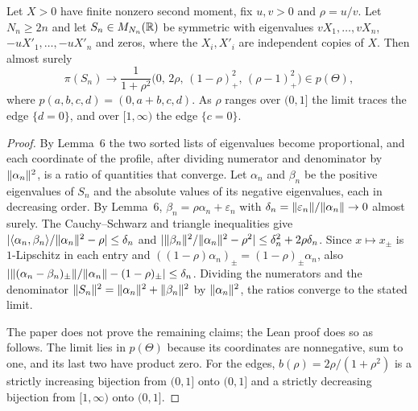 \setcounter{theorem}{4}
\begin{theorem}[Accumulation]
\label{thm:accumulation}
\leanok
{}
Let $X>0$ have finite nonzero second moment, fix $u,v>0$ and $\rho=u/v$. Let
$N_n\ge2n$ and let $S_n\in M_{N_n}(\mathbb{R})$ be symmetric with eigenvalues
$vX_1,\ldots,vX_n$, $-uX'_1,\ldots,-uX'_n$ and zeros, where the $X_i,X'_i$
are independent copies of $X$. Then almost surely
\[
 \pi(S_n)\longrightarrow\frac1{1+\rho^2}\bigl(0,\,2\rho,\,(1-\rho)_+^2,\,(\rho-1)_+^2\bigr)\in p(\Theta),
\]
where $p(a,b,c,d)=(0,a+b,c,d)$. As $\rho$ ranges over $(0,1]$ the limit
traces the edge $\{d=0\}$, and over $[1,\infty)$ the edge $\{c=0\}$.
\end{theorem}
\begin{proof}
\leanok
{}
By Lemma~6 the two sorted lists of eigenvalues become proportional, and
each coordinate of the profile, after dividing numerator and denominator
by $\lVert \alpha_n\rVert^2$, is a ratio of quantities that converge. Let
$\alpha_n$ and $\beta_n$ be the positive eigenvalues of $S_n$ and the
absolute values of its negative eigenvalues, each in decreasing order. By
Lemma~6, $\beta_n=\rho\alpha_n+\varepsilon_n$ with
$\delta_n=\lVert \varepsilon_n\rVert/\lVert \alpha_n\rVert\to0$ almost surely. The
Cauchy--Schwarz and triangle inequalities give
$|\langle\alpha_n,\beta_n\rangle/\lVert \alpha_n\rVert^2-\rho|\le\delta_n$ and
$|\lVert \beta_n\rVert^2/\lVert \alpha_n\rVert^2-\rho^2|\le\delta_n^2+2\rho\delta_n$.
Since $x\mapsto x_\pm$ is $1$-Lipschitz in each entry and
$((1-\rho)\alpha_n)_\pm=(1-\rho)_\pm\alpha_n$, also
$|\lVert (\alpha_n-\beta_n)_\pm\rVert/\lVert \alpha_n\rVert-(1-\rho)_\pm|\le\delta_n$.
Dividing the numerators and the denominator
$\lVert S_n\rVert^2=\lVert \alpha_n\rVert^2+\lVert \beta_n\rVert^2$ by $\lVert \alpha_n\rVert^2$,
the ratios converge to the stated limit.

The paper does not prove the remaining claims; the Lean proof does so as
follows. The limit lies in $p(\Theta)$ because its coordinates are
nonnegative, sum to one, and its last two have product zero. For the
edges, $b(\rho)=2\rho/(1+\rho^2)$ is a strictly increasing bijection from $(0,1]$ onto $(0,1]$ and a strictly decreasing bijection
from $[1,\infty)$ onto $(0,1]$.
\end{proof}

